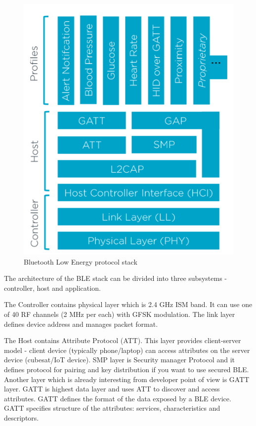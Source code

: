 \documentclass[conference]{IEEEtran}
\begin{document}
\begin{figure}[htbp]
	\centerline{\includegraphics[scale=0.5]{images/ble-stack}}
	\caption{Bluetooth Low Energy protocol stack \cite{ble-nordic-intro}}
	\label{ble}
\end{figure}

The architecture of the BLE stack can be divided into three subsystems - controller, host and application.\cite{ble-nordic-intro}

The Controller contains physical layer which is 2.4 GHz ISM band. It can use one of 40 RF channels (2 MHz per each) with GFSK modulation. The link layer defines device address and manages packet format.

The Host contains Attribute Protocol (ATT). This layer provides client-server model - client device (typically phone/laptop) can access attributes on the server device (cubesat/IoT device). SMP layer is Security manager Protocol and it defines protocol for pairing and key distribution if you want to use secured BLE.
Another layer which is already interesting from developer point of view is GATT layer. GATT is highest data layer and uses ATT to discover and access attributes. GATT defines the format of the data exposed by a BLE device. GATT specifies structure of the attributes: services, characteristics and descriptors.
\end{document}
